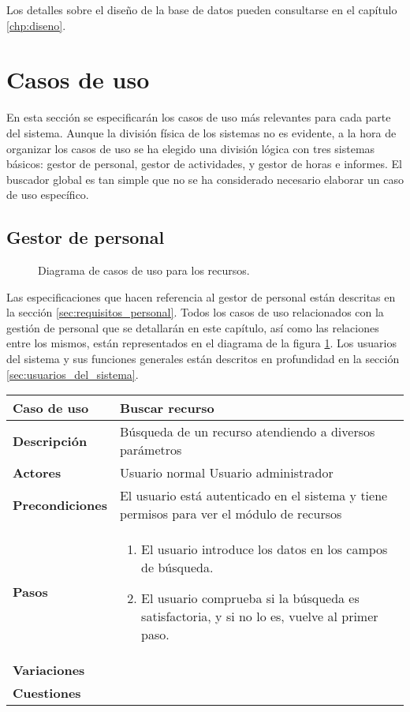 Los detalles sobre el diseño de la base de datos pueden consultarse en el
capítulo \ref{chp:diseno}.

\section{Casos de uso}
\label{sec:casos_de_uso}

En esta sección se especificarán los casos de uso más relevantes para cada
parte del sistema. Aunque la división física de los sistemas no es evidente, a
la hora de organizar los casos de uso se ha elegido una división lógica con
tres sistemas básicos: gestor de personal, gestor de actividades, y gestor de
horas e informes. El buscador global es tan simple que no se ha considerado
necesario elaborar un caso de uso específico.

\subsection{Gestor de personal}

\begin{figure}
\centering
{}
\caption{Diagrama de casos de uso para los recursos.}
\label{fig:CU_recursos}
\end{figure}

Las especificaciones que hacen referencia al gestor de personal están
descritas en la sección \ref{sec:requisitos_personal}. Todos los casos de uso
relacionados con la gestión de personal que se detallarán en este capítulo, así
como las relaciones entre los mismos, están representados en el diagrama de la
figura \ref{fig:CU_recursos}. Los usuarios del sistema y sus funciones generales
están descritos en profundidad en la sección \ref{sec:usuarios_del_sistema}.

\begin{tabular}{|p{1.25in}|p{3.65in}|}\hline
\textbf{Caso de uso} & \textbf{Buscar recurso}\\\hline\hline
\textbf{Descripción} & Búsqueda de un recurso atendiendo a diversos
parámetros\\\hline
\textbf{Actores} & Usuario normal \newline Usuario administrador\\\hline
\textbf{Precondiciones} & El usuario está autenticado en el sistema y
tiene permisos para ver el módulo de recursos\\\hline
\textbf{Pasos} &
  \begin{enumerate}
   \item El usuario introduce los datos en los campos de búsqueda.
   \item El usuario comprueba si la búsqueda es satisfactoria, y si no lo es,
vuelve al primer paso.
  \end{enumerate}
\\\hline
\textbf{Variaciones} & \\\hline
\textbf{Cuestiones} & \\\hline
\end{tabular}

